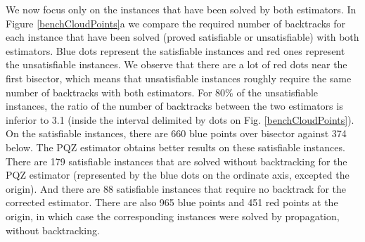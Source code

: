 \documentclass[jair,twoside,11pt,theapa]{article}
\begin{document}





We now focus only on the instances that have been solved by both estimators. In Figure \ref{benchCloudPoints}a we compare the required number of backtracks for each instance that have been solved (proved satisfiable or unsatisfiable) with both estimators. Blue dots represent the satisfiable instances and red ones represent the unsatisfiable instances. We observe that there are a lot of red dots near the first bisector, which means that unsatisfiable instances roughly require the same number of backtracks with both estimators. For 80\% of the unsatisfiable instances, the ratio of the number of backtracks between the two estimators is inferior to 3.1 (inside the interval delimited by dots on Fig. \ref{benchCloudPoints}). %
On the satisfiable instances, there are 660 blue points over bisector against 374 below. The PQZ estimator obtains better results on these satisfiable instances. 
There are 179 satisfiable instances that are solved without backtracking for the PQZ estimator (represented by the blue dots on the ordinate axis, excepted the origin). And there are 88 satisfiable instances that require no backtrack for the corrected estimator. There are also 965 blue points and 451 red points at the origin, in which case the corresponding instances were solved by propagation, without backtracking.

\end{document}
